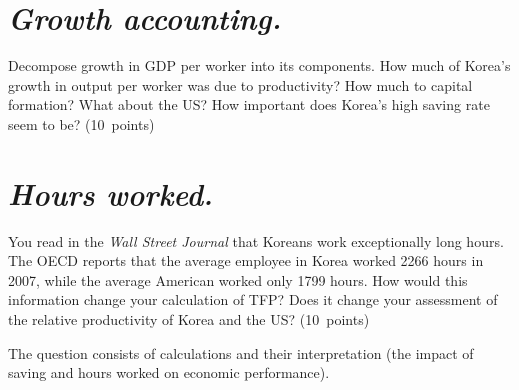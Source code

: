 \documentclass[letterpaper,12pt]{exam}
\begin{document}
\begin{questions}
\begin{parts}
\part {\it Growth accounting.\/}   
Decompose growth in GDP per worker into its components.  
How much of Korea's growth in output per worker was due to productivity?
How much to capital formation?  
What about the US?  
How important does Korea's high saving rate seem to be?  
(10~points)

\part {\it Hours worked.\/}   
You read in the {\it Wall Street Journal\/} 
that Koreans work exceptionally 
long hours.  
The OECD reports that the average employee in Korea worked 2266 hours in 2007,
while the average American worked only 1799 hours.  
How would this information change your calculation of TFP?
Does it change your assessment of the relative productivity 
of Korea and the US?  
(10~points)
\end{parts}

\begin{solution}
The question consists of calculations
and their interpretation (the impact of saving and hours worked
on economic performance).  
%
\end{solution}
\end{questions}
\end{document}
